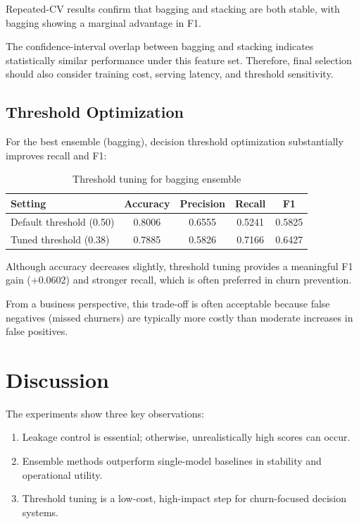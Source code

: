 \documentclass[conference]{IEEEtran}
\begin{document}
Repeated-CV results confirm that bagging and stacking are both stable, with bagging showing a marginal advantage in F1.

The confidence-interval overlap between bagging and stacking indicates statistically similar performance under this feature set. Therefore, final selection should also consider training cost, serving latency, and threshold sensitivity.

\subsection{Threshold Optimization}
For the best ensemble (bagging), decision threshold optimization substantially improves recall and F1:
\begin{table}[!t]
\centering
\caption{Threshold tuning for bagging ensemble}
\label{tab:threshold}
\begin{tabular}{lcccc}
\toprule
Setting & Accuracy & Precision & Recall & F1 \\
\midrule
Default threshold (0.50) & 0.8006 & 0.6555 & 0.5241 & 0.5825 \\
Tuned threshold (0.38) & 0.7885 & 0.5826 & 0.7166 & 0.6427 \\
\bottomrule
\end{tabular}
\end{table}

Although accuracy decreases slightly, threshold tuning provides a meaningful F1 gain (+0.0602) and stronger recall, which is often preferred in churn prevention.

From a business perspective, this trade-off is often acceptable because false negatives (missed churners) are typically more costly than moderate increases in false positives.

\section{Discussion}
The experiments show three key observations:
\begin{enumerate}
\item Leakage control is essential; otherwise, unrealistically high scores can occur.
\item Ensemble methods outperform single-model baselines in stability and operational utility.
\item Threshold tuning is a low-cost, high-impact step for churn-focused decision systems.
\end{enumerate}
\end{document}
